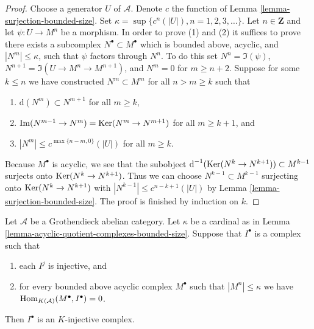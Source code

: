\begin{proof}
Choose a generator $U$ of $\mathcal{A}$. Denote $c$ the function of
Lemma \ref{lemma-surjection-bounded-size}.
Set $\kappa = \sup \{c^n(|U|), n = 1, 2, 3, \ldots\}$.
Let $n \in \mathbf{Z}$ and let $\psi : U \to M^n$ be a morphism.
In order to prove (1) and (2) it suffices to prove there exists a subcomplex
$N^\bullet \subset M^\bullet$ which is bounded above, acyclic, and
$|N^m| \leq \kappa$, such that $\psi$ factors through $N^n$.
To do this set $N^n = \Im(\psi)$, $N^{n + 1} = \Im(U \to M^n \to M^{n + 1})$,
and $N^m = 0$ for $m \geq n + 2$.
Suppose for some $k \leq n$ we have constructed $N^m \subset M^m$
for all $n > m \geq k$ such that
\begin{enumerate}
\item $\text{d}(N^m) \subset N^{m + 1}$ for all $m \geq k$,
\item $\mathop{\mathrm{Im}}(N^{m - 1} \to N^m) = \mathop{\mathrm{Ker}}(N^m \to N^{m + 1})$ for
all $m \geq k + 1$, and
\item $|N^m| \leq c^{\max\{n - m, 0\}}(|U|)$ for all $m \geq k$.
\end{enumerate}
Because $M^\bullet$ is acyclic, we see that the subobject
$\text{d}^{-1}(\mathop{\mathrm{Ker}}(N^k \to N^{k + 1})) \subset M^{k - 1}$ surjects onto
$\mathop{\mathrm{Ker}}(N^k \to N^{k + 1})$. Thus we can choose $N^{k - 1} \subset M^{k - 1}$
surjecting onto $\mathop{\mathrm{Ker}}(N^k \to N^{k + 1})$ with
$|N^{k - 1}| \leq c^{n - k + 1}(|U|)$ by
Lemma \ref{lemma-surjection-bounded-size}. The proof is finished by
induction on $k$.
\end{proof}

\begin{lemma}
\label{lemma-characterize-K-injective}
Let $\mathcal{A}$ be a Grothendieck abelian category.
Let $\kappa$ be a cardinal as in
Lemma \ref{lemma-acyclic-quotient-complexes-bounded-size}.
Suppose that $I^\bullet$ is a complex such that
\begin{enumerate}
\item each $I^j$ is injective, and
\item for every bounded above acyclic complex $M^\bullet$
such that $|M^n| \leq \kappa$
we have $\mathop{\mathrm{Hom}}\nolimits_{K(\mathcal{A})}(M^\bullet, I^\bullet) = 0$.
\end{enumerate}
Then $I^\bullet$ is an $K$-injective complex.
\end{lemma}

